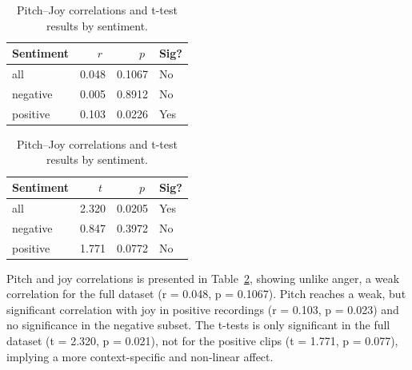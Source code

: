   \begin{table}[H]
    \centering
  
    \begin{subtable}{0.45\textwidth}
      \centering
      \caption{Pitch and Joy (r)}\label{tab:rq1_corr_pitch_joy}
      \begin{tabular}{l r r l}
        \toprule
        Sentiment & \(\;r\;\) & \(\;p\;\) & Sig? \\
        \midrule
        all      & 0.048 & 0.1067 & No  \\
        negative & 0.005 & 0.8912 & No  \\
        positive & 0.103 & 0.0226 & Yes \\
        \bottomrule
      \end{tabular}
    \end{subtable}\hfill
    \begin{subtable}{0.45\textwidth}
      \centering
      \caption{Pitch and Joy (t-test)}\label{tab:rq1_ttest_pitch_joy}
      \begin{tabular}{l r r l}
        \toprule
        Sentiment & \(\;t\;\) & \(\;p\;\) & Sig? \\
        \midrule
        all      & 2.320 & 0.0205 & Yes \\
        negative & 0.847 & 0.3972 & No  \\
        positive & 1.771 & 0.0772 & No  \\
        \bottomrule
      \end{tabular}
    \end{subtable}
  
    \caption{Pitch–Joy correlations and t-test results by sentiment.}
    \label{tab:rq1_pitch_joy_side_by_side}
  \end{table}
  
  Pitch and joy correlations is presented in Table~\ref{tab:rq1_pitch_joy_side_by_side}, showing unlike anger, a weak correlation for the full dataset (r = 0.048, p = 0.1067). 
  Pitch reaches a weak, but significant correlation with joy in positive recordings (r = 0.103, p = 0.023) and no significance in the negative subset. 
  The t-tests is only significant in the full dataset (t = 2.320, p = 0.021), not for the positive clips (t = 1.771, p = 0.077), implying a more context-specific and non-linear affect.
  
